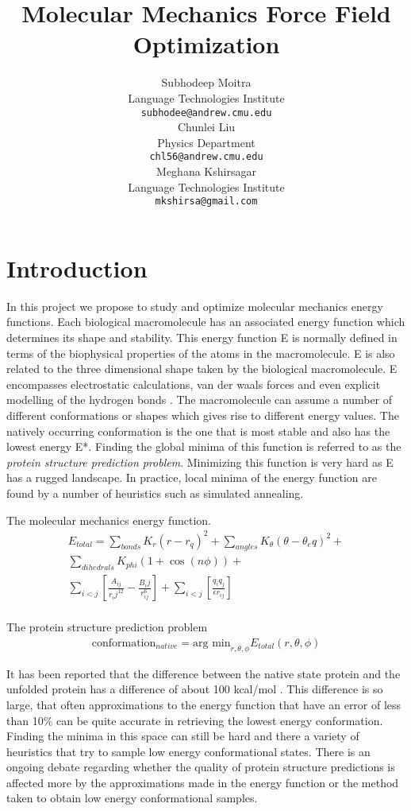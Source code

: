 \documentclass{article} %
\title{Molecular Mechanics Force Field Optimization}
\author{
Subhodeep Moitra\\
Language Technologies Institute\\
\texttt{subhodee@andrew.cmu.edu} \\
\And
Chunlei Liu \\
Physics Department \\
\texttt{chl56@andrew.cmu.edu} \\
\And
Meghana Kshirsagar \\
Language Technologies Institute\\
\texttt{mkshirsa@gmail.com}
}
\begin{document}
\maketitle

\section{Introduction}
In this project we propose to study and optimize molecular mechanics energy functions. Each biological macromolecule has an associated energy function which determines its shape and stability. This energy function E is normally defined in terms of the biophysical properties of the atoms in the macromolecule. E is also related to the three dimensional shape taken by the biological macromolecule. E encompasses electrostatic calculations, van der waals forces and even explicit modelling of the hydrogen bonds \cite{Boas2007}. The macromolecule can assume a number of different conformations or shapes which gives rise to different energy values. The natively occurring conformation is the one that is most stable and also has the lowest energy E*. Finding the global minima of this function is referred to as the \emph{protein structure prediction problem}. Minimizing this function is very hard as E has a rugged landscape. In practice, local minima of the energy function are found by a number of heuristics such as simulated annealing. 

The molecular mechanics energy function.
\begin{align*}
E_{total} = \sum_{bonds}K_r(r-r_q)^2 + \sum_{angles}K_{\theta}(\theta-\theta_eq)^2 + \\
\sum_{dihedrals}K_{phi}(1+\cos(n\phi)) + \\
\sum_{i<j}\left[\frac{A_{ij}}{r_ij^{12}} - \frac{B_ij}{r_{ij}^6} \right] + \sum_{i<j}\left[\frac{q_iq_j}{\epsilon r_{ij}} \right] \\
\end{align*}

The protein structure prediction problem
\begin{align*}
\text{conformation}_{native} = \text{arg min}_{r,\theta,\phi} E_{total}(r,\theta,\phi)
\end{align*}


It has been reported that the difference between the native state protein and the unfolded protein has a difference of about 100 kcal/mol \cite{BakerDas2008}. This difference is so large, that often approximations to the energy function that have an error of less than 10\% can be quite accurate in retrieving the lowest energy conformation. Finding the minima in this space can still be hard and there a variety of heuristics that try to sample low energy conformational states. There is an ongoing debate regarding whether the quality of protein structure predictions is affected more by the approximations made in the energy function or the method taken to obtain low energy conformational samples\cite{BakerDas2008}. 
\end{document}
